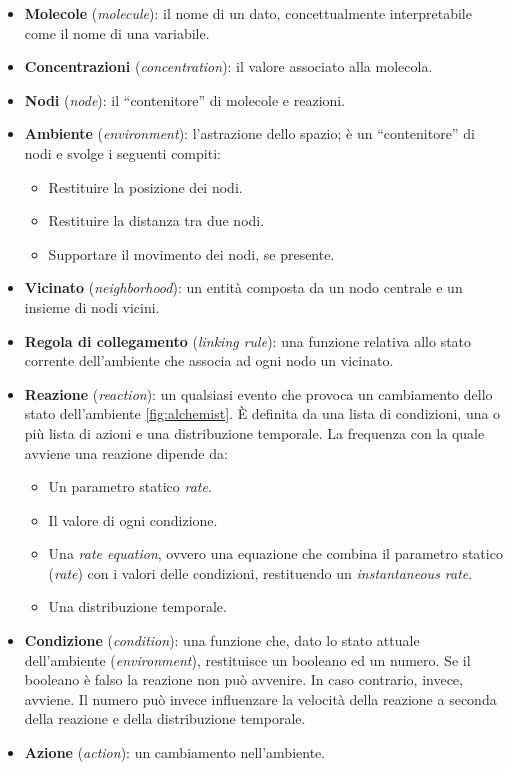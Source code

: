 \begin{itemize}
    \item \textbf{Molecole} (\textit{molecule}): il nome di un dato, concettualmente interpretabile come il nome di una variabile.
    \item \textbf{Concentrazioni} (\textit{concentration}): il valore associato alla molecola.
    \item \textbf{Nodi}\label{node} (\textit{node}): il ``contenitore'' di molecole e reazioni.
    \item \textbf{Ambiente} (\textit{environment}): l'astrazione dello spazio; è un “contenitore” di nodi e svolge i seguenti compiti:
    \begin{itemize}
        \item Restituire la posizione dei nodi.
        \item Restituire la distanza tra due nodi.
        \item Supportare il movimento dei nodi, se presente.
    \end{itemize}
    \item \textbf{Vicinato} (\textit{neighborhood}): un entità composta da un nodo centrale e un insieme di nodi vicini.
    \item \textbf{Regola di collegamento} (\textit{linking rule}): una funzione relativa allo stato corrente dell'ambiente che associa ad ogni nodo un vicinato.
    \item \textbf{Reazione} (\textit{reaction}): un qualsiasi evento che provoca un cambiamento dello stato dell'ambiente \cref{fig:alchemist}. È definita da una lista di condizioni, una o più lista di azioni e una distribuzione temporale. La frequenza con la quale avviene una reazione dipende da:
    \begin{itemize}
        \item Un parametro statico \textit{rate}.
        \item Il valore di ogni condizione.
        \item Una \textit{rate equation}, ovvero una equazione che combina il parametro statico (\textit{rate}) con i valori delle condizioni, restituendo un \textit{instantaneous rate}.
        \item Una distribuzione temporale.
    \end{itemize}
    \item \textbf{Condizione} (\textit{condition}): una funzione che, dato lo stato attuale dell'ambiente (\textit{environment}), restituisce un booleano ed un numero. Se il booleano è falso la reazione non può avvenire. In caso contrario, invece, avviene. Il numero può invece influenzare la velocità della reazione a seconda della reazione e della distribuzione temporale.
    \item \textbf{Azione} (\textit{action}): un cambiamento nell'ambiente.
\end{itemize}
